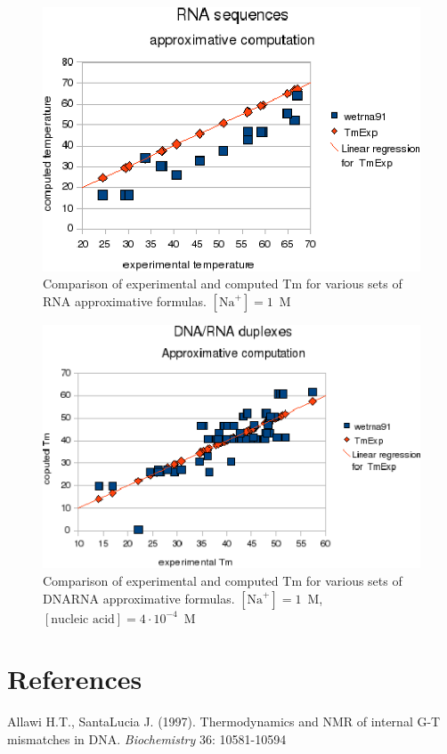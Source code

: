\documentclass{article}
\begin{document}
\begin{figure}[h]
\includegraphics{images/RNAApproximativeMode.eps}
\caption{Comparison of experimental and computed Tm for various sets of
 RNA approximative formulas. $[\mbox{Na}^+] = 1$~M}
\end{figure}

\begin{figure}[h]
\includegraphics{images/DNARNAApproximativeMode.eps}
\caption{Comparison of experimental and computed Tm for various sets of
 DNARNA approximative formulas. $[\mbox{Na}^+] = 1$~M, $[\mbox{nucleic acid}] = 4\cdot{}10^{-4}$~M}
\end{figure}      
      
\section{References }
Allawi H.T., SantaLucia J. (1997). Thermodynamics and NMR of internal G-T mismatches 
in DNA. \textit{Biochemistry}  36: 10581-10594   
\end{document}
